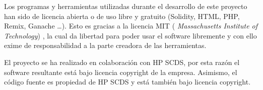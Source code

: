 Los programas y herramientas utilizadas durante el desarrollo de este proyecto han sido de licencia abierta o de uso libre y gratuito (Solidity, HTML, PHP, Remix, Ganache \ldots). Esto es gracias a la licencia MIT ( \textit{Massachusetts Institute of Technology}) \cite{MIT}, la cual da libertad para poder usar el software libremente y con ello exime de responsabilidad a la parte creadora de las herramientas.
	
El proyecto se ha realizado en colaboración con HP SCDS, por esta razón el software resultante está bajo licencia copyright de la empresa. Asimismo, el código fuente es propiedad de HP SCDS y está también bajo licencia copyright.
